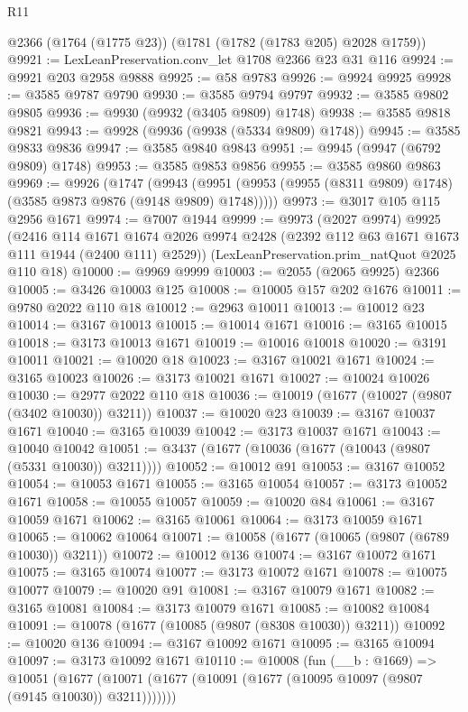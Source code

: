 \begin{lexlean}{R11}
\begin{coremodule}
    @2366
    (@1764 (@1775 @23))
    (@1781 (@1782 (@1783 @205) @2028 @1759))
@9921 := LexLeanPreservation.conv_let @1708 @2366 @23 @31 @116
@9924 := @9921 @203 @2958 @9888
@9925 := @58 @9783
@9926 := @9924 @9925
@9928 := @3585 @9787 @9790
@9930 := @3585 @9794 @9797
@9932 := @3585 @9802 @9805
@9936 := @9930 (@9932 (@3405 @9809) @1748)
@9938 := @3585 @9818 @9821
@9943 := @9928 (@9936 (@9938 (@5334 @9809) @1748))
@9945 := @3585 @9833 @9836
@9947 := @3585 @9840 @9843
@9951 := @9945 (@9947 (@6792 @9809) @1748)
@9953 := @3585 @9853 @9856
@9955 := @3585 @9860 @9863
@9969 := @9926
    (@1747
      (@9943 (@9951 (@9953 (@9955 (@8311 @9809) @1748) (@3585 @9873 @9876 (@9148 @9809) @1748)))))
@9973 := @3017 @105 @115 @2956 @1671
@9974 := @7007 @1944
@9999 := @9973
    (@2027 @9974)
    @9925
    (@2416
      @114
      @1671
      @1674
      @2026
      @9974
      @2428
      (@2392 @112 @63 @1671 @1673 @111 @1944 (@2400 @111) @2529))
    (LexLeanPreservation.prim_natQuot @2025 @110 @18)
@10000 := @9969 @9999
@10003 := @2055 (@2065 @9925) @2366
@10005 := @3426 @10003 @125
@10008 := @10005 @157 @202 @1676
@10011 := @9780 @2022 @110 @18
@10012 := @2963 @10011
@10013 := @10012 @23
@10014 := @3167 @10013
@10015 := @10014 @1671
@10016 := @3165 @10015
@10018 := @3173 @10013 @1671
@10019 := @10016 @10018
@10020 := @3191 @10011
@10021 := @10020 @18
@10023 := @3167 @10021 @1671
@10024 := @3165 @10023
@10026 := @3173 @10021 @1671
@10027 := @10024 @10026
@10030 := @2977 @2022 @110 @18
@10036 := @10019 (@1677 (@10027 (@9807 (@3402 @10030)) @3211))
@10037 := @10020 @23
@10039 := @3167 @10037 @1671
@10040 := @3165 @10039
@10042 := @3173 @10037 @1671
@10043 := @10040 @10042
@10051 := @3437 (@1677 (@10036 (@1677 (@10043 (@9807 (@5331 @10030)) @3211))))
@10052 := @10012 @91
@10053 := @3167 @10052
@10054 := @10053 @1671
@10055 := @3165 @10054
@10057 := @3173 @10052 @1671
@10058 := @10055 @10057
@10059 := @10020 @84
@10061 := @3167 @10059 @1671
@10062 := @3165 @10061
@10064 := @3173 @10059 @1671
@10065 := @10062 @10064
@10071 := @10058 (@1677 (@10065 (@9807 (@6789 @10030)) @3211))
@10072 := @10012 @136
@10074 := @3167 @10072 @1671
@10075 := @3165 @10074
@10077 := @3173 @10072 @1671
@10078 := @10075 @10077
@10079 := @10020 @91
@10081 := @3167 @10079 @1671
@10082 := @3165 @10081
@10084 := @3173 @10079 @1671
@10085 := @10082 @10084
@10091 := @10078 (@1677 (@10085 (@9807 (@8308 @10030)) @3211))
@10092 := @10020 @136
@10094 := @3167 @10092 @1671
@10095 := @3165 @10094
@10097 := @3173 @10092 @1671
@10110 := @10008
    (fun (__b : @1669) =>
    @10051 (@1677 (@10071 (@1677 (@10091 (@1677 (@10095 @10097 (@9807 (@9145 @10030)) @3211)))))))

\end{coremodule}
\end{lexlean}
